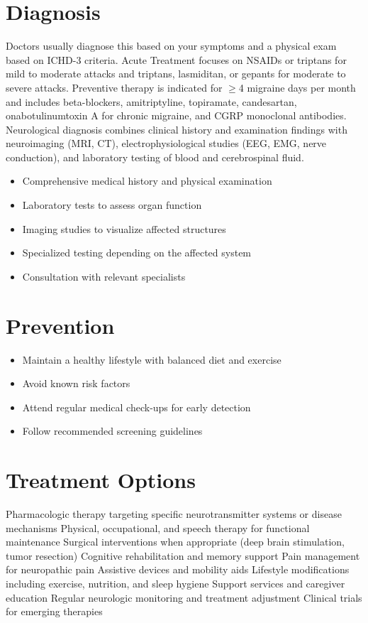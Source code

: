 \section{Diagnosis}
Doctors usually diagnose this based on your symptoms and a physical exam based on ICHD-3 criteria. Acute Treatment focuses on NSAIDs or triptans for mild to moderate attacks and triptans, lasmiditan, or gepants for moderate to severe attacks. Preventive therapy is indicated for $\ge$4 migraine days per month and includes beta-blockers, amitriptyline, topiramate, candesartan, onabotulinumtoxin A for chronic migraine, and CGRP monoclonal antibodies. Neurological diagnosis combines clinical history and examination findings with neuroimaging (MRI, CT), electrophysiological studies (EEG, EMG, nerve conduction), and laboratory testing of blood and cerebrospinal fluid.

\begin{itemize}[noitemsep]
  \item Comprehensive medical history and physical examination
  \item Laboratory tests to assess organ function
  \item Imaging studies to visualize affected structures
  \item Specialized testing depending on the affected system
  \item Consultation with relevant specialists
\end{itemize}
\section{Prevention}
\begin{itemize}[noitemsep]
  \item Maintain a healthy lifestyle with balanced diet and exercise
  \item Avoid known risk factors
  \item Attend regular medical check-ups for early detection
  \item Follow recommended screening guidelines
\end{itemize}
\section{Treatment Options}
Pharmacologic therapy targeting specific neurotransmitter systems or disease mechanisms Physical, occupational, and speech therapy for functional maintenance Surgical interventions when appropriate (deep brain stimulation, tumor resection) Cognitive rehabilitation and memory support Pain management for neuropathic pain Assistive devices and mobility aids Lifestyle modifications including exercise, nutrition, and sleep hygiene Support services and caregiver education Regular neurologic monitoring and treatment adjustment Clinical trials for emerging therapies

